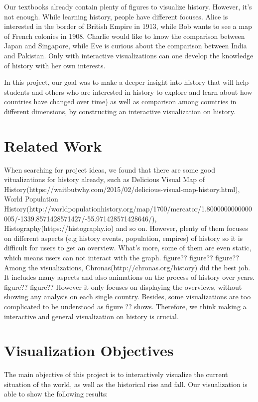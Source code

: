 \documentclass[12pt, fullpage,letterpaper]{article}
\begin{document}
Our textbooks already contain plenty of figures to visualize history. However,
it's not enough. While learning history, people have different focuses.  Alice
is interested in the border of British Empire in 1913, while Bob wants to see a
map of French colonies in 1908. Charlie would like to know the comparison
between Japan and Singapore, while Eve is curious about the comparison between
India and Pakistan.  Only with interactive visualizations can one develop the
knowledge of history with her own interests.

In this project, our goal was to make a deeper insight into history that will help
students and others who are interested in history to explore and learn about how countries
have changed over time) as well as comparison among countries in different dimensions, by constructing
an interactive visualization on history.

\section{Related Work}
When searching for project ideas, we found that there are some good vitualizations for history already,
such as Delicious Visual Map of History(https://waitbutwhy.com/2015/02/delicious-visual-map-history.html), World Population History(http://worldpopulationhistory.org/map/1700/mercator/1.8000000000000005/-1339.8571428571427/-55.971428571428646/), Histography(https://histography.io)
and so on. However, plenty of them focuses on different aspects (e.g history events, population, empires) of history 
so it is difficult for users to get an overview.
What's more, some of them are even static, which means users can not interact with the graph. 
figure??
figure??
figure??
Among the visualizations, Chronas(http://chronas.org/history) did the best job. It includes many aspects
and also animations on the process of history over years.
figure??
figure??
However it only focuses on displaying the overviews, without showing any analysis on each single country.
Besides, some visualizations are too complicated to be understood as figure ?? shows. Therefore, we think
making a interactive and general visualization on history is crucial.


\section{Visualization Objectives}
The main objective of this project is to interactively visualize the current situation of the world,
as well as the historical rise and fall. Our visualization is able to show the following results:
\end{document}
